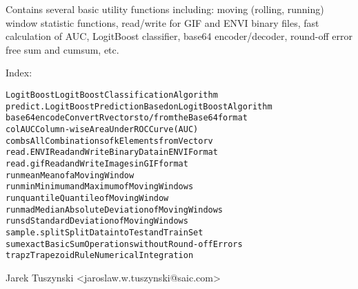 \begin{Description}\relax
Contains several basic utility functions including: moving
(rolling, running) window statistic functions, read/write for
GIF and ENVI binary files, fast calculation of AUC, LogitBoost
classifier, base64 encoder/decoder, round-off error free sum
and cumsum, etc.
\end{Description}
\begin{Details}\relax
{}

Index:
\begin{alltt}
LogitBoost              LogitBoost Classification Algorithm
predict.LogitBoost      Prediction Based on LogitBoost Algorithm
base64encode            Convert R vectors to/from the Base64 format
colAUC                  Column-wise Area Under ROC Curve (AUC)
combs                   All Combinations of k Elements from Vector v
read.ENVI               Read and Write Binary Data in ENVI Format
read.gif                Read and Write Images in GIF format
runmean                 Mean of a Moving Window
runmin                  Minimum and Maximum of Moving Windows
runquantile             Quantile of Moving Window
runmad                  Median Absolute Deviation of Moving Windows
runsd                   Standard Deviation of Moving Windows
sample.split            Split Data into Test and Train Set
sumexact                Basic Sum Operations without Round-off Errors
trapz                   Trapezoid Rule Numerical Integration
\end{alltt}
\end{Details}
\begin{Author}\relax
Jarek Tuszynski \textless{}jaroslaw.w.tuszynski@saic.com\textgreater{}
\end{Author}
